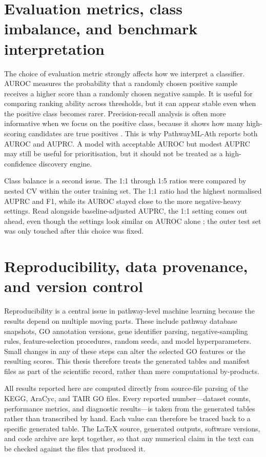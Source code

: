 \documentclass[12pt,letterpaper,oneside,openany]{book}
\begin{document}
\section{Evaluation metrics, class imbalance, and benchmark interpretation}
\label{sec:lit_metrics}

The choice of evaluation metric strongly affects how we interpret a classifier. AUROC measures the probability that a randomly chosen positive sample receives a higher score than a randomly chosen negative sample. It is useful for comparing ranking ability across thresholds, but it can appear stable even when the positive class becomes rarer. Precision-recall analysis is often more informative when we focus on the positive class, because it shows how many high-scoring candidates are true positives \citep{saito2015precision}. This is why PathwayML-Ath reports both AUROC and AUPRC. A model with acceptable AUROC but modest AUPRC may still be useful for prioritisation, but it should not be treated as a high-confidence discovery engine.

Class balance is a second issue. The 1:1 through 1:5 ratios were compared by nested CV within the outer training set. The 1:1 ratio had the highest normalised AUPRC and F1, while its AUROC stayed close to the more negative-heavy settings. Read alongside baseline-adjusted AUPRC, the 1:1 setting comes out ahead, even though the settings look similar on AUROC alone \citep{saito2015precision}; the outer test set was only touched after this choice was fixed.

\section{Reproducibility, data provenance, and version control}
\label{sec:lit_reproducibility}

Reproducibility is a central issue in pathway-level machine learning because the results depend on multiple moving parts. These include pathway database snapshots, GO annotation versions, gene identifier parsing, negative-sampling rules, feature-selection procedures, random seeds, and model hyperparameters. Small changes in any of these steps can alter the selected GO features or the resulting scores. This thesis therefore treats the generated tables and manifest files as part of the scientific record, rather than mere computational by-products.

All results reported here are computed directly from source-file parsing of the KEGG, AraCyc, and TAIR GO files. Every reported number---dataset counts, performance metrics, and diagnostic results---is taken from the generated tables rather than transcribed by hand. Each value can therefore be traced back to a specific generated table. The LaTeX source, generated outputs, software versions, and code archive are kept together, so that any numerical claim in the text can be checked against the files that produced it.
\end{document}
